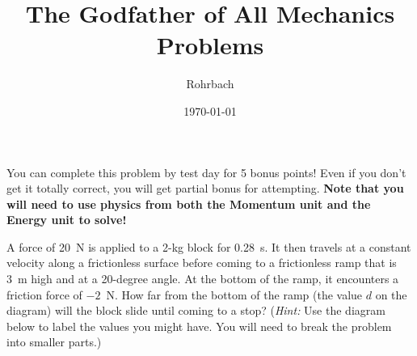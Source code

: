 \documentclass[10pt]{exam}
\title{The Godfather of All Mechanics Problems}
\author{Rohrbach}
\date{\today}
\begin{document}
\maketitle

\noindent
You can complete this problem by test day for 5 bonus points!  Even if you don't get it totally correct, you will get partial bonus for attempting.  {\bf Note that you will need to use physics from both the Momentum unit and the Energy unit to solve!}

\vspace{2em}

A force of 20~N is applied to a 2-kg block for 0.28~s.  It then travels at a constant velocity along a frictionless surface before coming to a frictionless ramp that is 3~m high and at a 20-degree angle.  At the bottom of the ramp, it encounters a friction force of $-2$~N.  How far from the bottom of the ramp (the value $d$ on the diagram) will the block slide until coming to a stop? (\emph{Hint:} Use the diagram below to label the values you might have.  You will need to break the problem into smaller parts.)

\vspace{3em}

\end{document}
